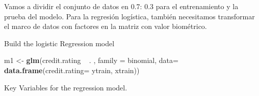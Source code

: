 \documentclass[]{article}
\newenvironment{Shaded}{\begin{snugshade}}{\end{snugshade}}
\newcommand{\KeywordTok}[1]{\textcolor[rgb]{0.13,0.29,0.53}{\textbf{{#1}}}}
\newcommand{\DataTypeTok}[1]{\textcolor[rgb]{0.13,0.29,0.53}{{#1}}}
\newcommand{\DecValTok}[1]{\textcolor[rgb]{0.00,0.00,0.81}{{#1}}}
\newcommand{\FloatTok}[1]{\textcolor[rgb]{0.00,0.00,0.81}{{#1}}}
\newcommand{\StringTok}[1]{\textcolor[rgb]{0.31,0.60,0.02}{{#1}}}
\newcommand{\CommentTok}[1]{\textcolor[rgb]{0.56,0.35,0.01}{\textit{{#1}}}}
\newcommand{\NormalTok}[1]{{#1}}
\numberwithin{equation}{section}
\begin{document}
Vamos a dividir el conjunto de datos en 0.7: 0.3 para el entrenamiento y
la prueba del modelo. Para la regresión logística, también necesitamos
transformar el marco de datos con factores en la matriz con valor
biométrico.

\begin{Shaded}
\end{Shaded}

Build the logistic Regression model

\begin{Shaded}
\begin{Highlighting}[]
\NormalTok{m1 <-}\StringTok{ }\KeywordTok{glm}\NormalTok{(credit.rating ~}\StringTok{ }\NormalTok{. , }\DataTypeTok{family =} \NormalTok{binomial, }\DataTypeTok{data=} \KeywordTok{data.frame}\NormalTok{(}\DataTypeTok{credit.rating=} \NormalTok{ytrain, xtrain))}
\end{Highlighting}
\end{Shaded}

Key Variables for the regression model.

\begin{Shaded}
\end{Shaded}
\end{document}
